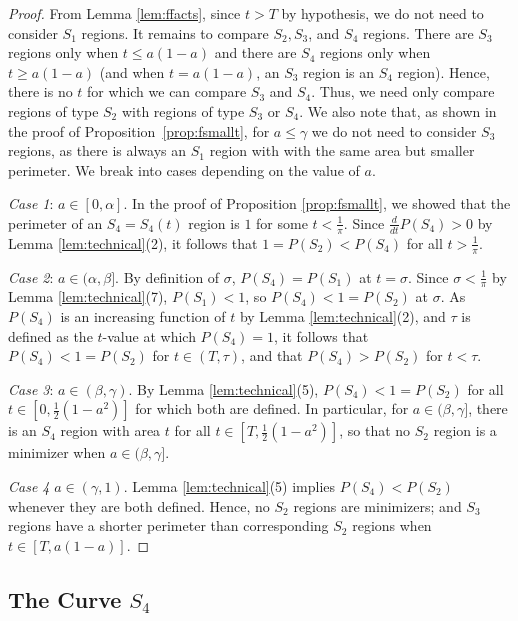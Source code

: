 \documentclass[leqno]{article}
\numberwithin{equation}{section}
\theoremstyle{definition}
\theoremstyle{remark}
\theoremstyle{plain}
\begin{document}
\begin{proof}From Lemma \ref{lem:ffacts}, since $t > T$ by hypothesis, we do not need to consider $S_1$ regions.  It remains to compare $S_2,S_3$, and $S_4$ regions. There are $S_3$ regions  only when $t\leq a(1-a)$ and there are $S_4$ regions only when $t \geq a(1-a)$ (and when $t = a(1-a)$, an $S_3$ region is an $S_4$ region). Hence, there is no $t$ for which we can compare $S_3$ and $S_4$.  Thus, we need only compare regions of type $S_2$ with regions of type $S_3$ or $S_4$.  We also note that, as shown in the proof of Proposition~\ref{prop:fsmallt}, for $a\leq \gamma$ we do not need to consider $S_3$ regions, as there is always an $S_1$ region with with the same area but smaller perimeter.  We break into cases depending on the value of $a$.

\textit{Case 1}:  $a\in[0, \alpha]$.  In the proof of Proposition \ref{prop:fsmallt}, we showed that the perimeter of an $S_4 = S_4(t)$ region is $1$ for some $t < \frac{1}{\pi}$.  Since $\frac{d}{dt} P(S_4)  >0$ by Lemma \ref{lem:technical}(2), it follows that $1 = P(S_2) < P(S_4)$ for all $t > \frac{1}{\pi}$.

\textit{Case 2}:  $a\in(\alpha,\beta]$.  By definition of $\sigma$, $P(S_4) = P(S_1)$ at $t=\sigma$.  Since $\sigma < \frac{1}{\pi}$ by Lemma \ref{lem:technical}(7), $P(S_1) < 1$, so $P(S_4) < 1 = P(S_2)$ at $\sigma$.  As $P(S_4)$ is an increasing function of $t$ by Lemma \ref{lem:technical}(2), and $\tau$ is defined as the $t$-value at which $P(S_4) = 1$,  it follows that $P(S_4) < 1= P(S_2)$ for $t\in(T,\tau)$, and that $P(S_4) > P(S_2)$ for $t < \tau$.

\textit{Case 3}: $a\in(\beta, \gamma)$.  By Lemma \ref{lem:technical}(5), $P(S_4) < 1 = P(S_2)$ for all $t\in \left[0,\frac{1}{2}(1-a^2)\right]$ for which both are defined.  In particular, for $a\in (\beta,\gamma]$, there is an $S_4$ region with area $t$ for all $t \in [T, \frac{1}{2}(1-a^2)]$, so that no $S_2$ region is a minimizer when $a\in(\beta,\gamma]$.

\textit{Case 4} $a\in (\gamma,1)$.  Lemma \ref{lem:technical}(5) implies $P(S_4)< P(S_2)$ whenever they are both defined.  Hence, no $S_2$ regions are minimizers; and $S_3$ regions have a shorter perimeter than corresponding $S_2$ regions when $t\in [T,a(1-a)]$.

\end{proof}


\iffalse

\subsection{The Curve $S_4$}
\end{document}
